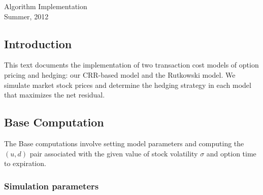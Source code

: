 \documentclass[10pt]{article}
\newcommand{\mys}{\vspace*{24pt}}
\begin{document}
\begin{center}
\Large Algorithm Implementation  \\ Summer, 2012
\end{center}

\mys

\subsection*{Introduction}

This text documents the implementation of two transaction cost
models of option pricing and hedging: our CRR-based model and
the Rutkowski model. We simulate market stock prices and determine
the hedging strategy in each model that maximizes the net residual.

\subsection*{Base Computation}
The Base computations involve setting model parameters and
computing the $(u,d)$ pair associated with the given value
of stock volatility $\sigma$ and option time to expiration.

\subsubsection*{Simulation parameters}
\end{document}
